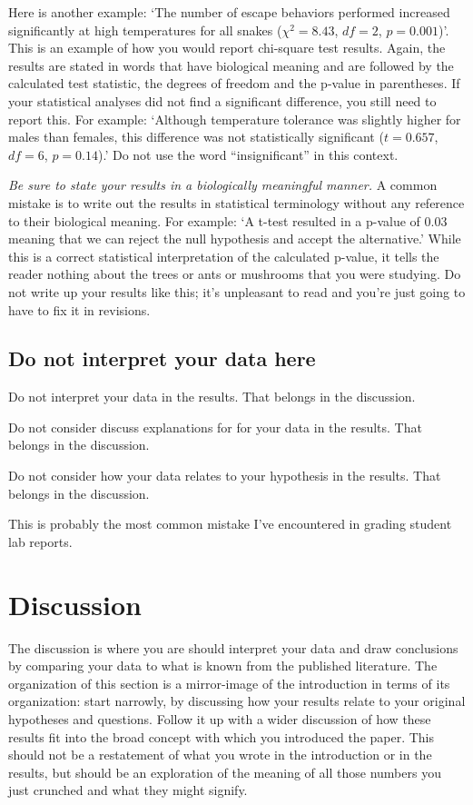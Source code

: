 \documentclass[]{book}
\begin{document}
Here is another example: `The number of escape behaviors performed
increased significantly at high temperatures for all snakes
(\(\chi^2 = 8.43\), \(df = 2\), \(p = 0.001\))'. This is an example of
how you would report chi-square test results. Again, the results are
stated in words that have biological meaning and are followed by the
calculated test statistic, the degrees of freedom and the p-value in
parentheses. If your statistical analyses did not find a significant
difference, you still need to report this. For example: `Although
temperature tolerance was slightly higher for males than females, this
difference was not statistically significant (\(t = 0.657\), \(df = 6\),
\(p = 0.14\)).' Do not use the word ``insignificant'' in this context.

\emph{Be sure to state your results in a biologically meaningful
manner.} A common mistake is to write out the results in statistical
terminology without any reference to their biological meaning. For
example: `A t-test resulted in a p-value of 0.03 meaning that we can
reject the null hypothesis and accept the alternative.' While this is a
correct statistical interpretation of the calculated p-value, it tells
the reader nothing about the trees or ants or mushrooms that you were
studying. Do not write up your results like this; it's unpleasant to
read and you're just going to have to fix it in revisions.

\subsection{Do not interpret your data
here}\label{do-not-interpret-your-data-here}

Do not interpret your data in the results. That belongs in the
discussion.

Do not consider discuss explanations for for your data in the results.
That belongs in the discussion.

Do not consider how your data relates to your hypothesis in the results.
That belongs in the discussion.

This is probably the most common mistake I've encountered in grading
student lab reports.

\section{Discussion}\label{discussion}

The discussion is where you are should interpret your data and draw
conclusions by comparing your data to what is known from the published
literature. The organization of this section is a mirror-image of the
introduction in terms of its organization: start narrowly, by discussing
how your results relate to your original hypotheses and questions.
Follow it up with a wider discussion of how these results fit into the
broad concept with which you introduced the paper. This should not be a
restatement of what you wrote in the introduction or in the results, but
should be an exploration of the meaning of all those numbers you just
crunched and what they might signify.
\end{document}

